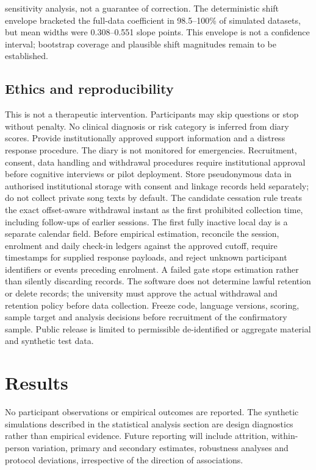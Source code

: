 \documentclass[11pt]{article}
\begin{document}
sensitivity analysis, not a guarantee of correction. The deterministic shift envelope bracketed the full-data coefficient in 98.5--100\% of simulated datasets, but mean widths were 0.308--0.551 slope points. This envelope is not a confidence interval; bootstrap coverage and plausible shift magnitudes remain to be established.
\subsection{Ethics and reproducibility}
This is not a therapeutic intervention. Participants may skip questions or stop without penalty. No clinical diagnosis or risk category is inferred from diary scores. Provide institutionally approved support information and a distress response procedure. The diary is not monitored for emergencies. Recruitment, consent, data handling and withdrawal procedures require institutional approval before cognitive interviews or pilot deployment. Store pseudonymous data in authorised institutional storage with consent and linkage records held separately; do not collect private song texts by default. The candidate cessation rule treats the exact offset-aware withdrawal instant as the first prohibited collection time, including follow-ups of earlier sessions. The first fully inactive local day is a separate calendar field. Before empirical estimation, reconcile the session, enrolment and daily check-in ledgers against the approved cutoff, require timestamps for supplied response payloads, and reject unknown participant identifiers or events preceding enrolment. A failed gate stops estimation rather than silently discarding records. The software does not determine lawful retention or delete records; the university must approve the actual withdrawal and retention policy before data collection. Freeze code, language versions, scoring, sample target and analysis decisions before recruitment of the confirmatory sample. Public release is limited to permissible de-identified or aggregate material and synthetic test data.
\section{Results}
No participant observations or empirical outcomes are reported. The synthetic simulations described in the statistical analysis section are design diagnostics rather than empirical evidence. Future reporting will include attrition, within-person variation, primary and secondary estimates, robustness analyses and protocol deviations, irrespective of the direction of associations.
\end{document}
